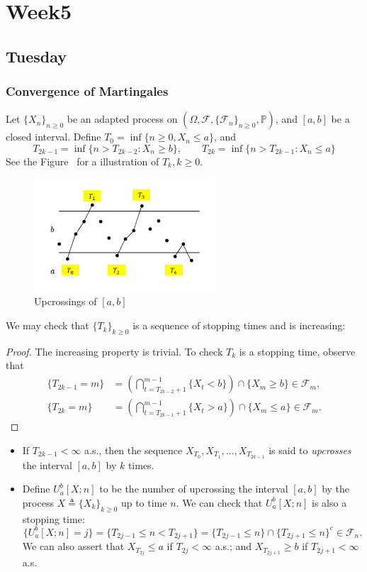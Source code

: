 
\chapter{Week5}

\section{Tuesday}

\subsection{Convergence of Martingales}

Let $\{X_n\}_{n\ge0}$ be an adapted process on $(\Omega,\mathcal{F},\{\mathcal{F}_n\}_{n\ge0},\mathbb{P})$, and $[a,b]$ be a closed interval.
Define $T_0=\inf\{n\ge0, X_n\le a\}$, and
\[
T_{2k-1} = \inf\{n>T_{2k-2}: X_n\ge b\},\qquad
T_{2k} = \inf\{n>T_{2k-1}: X_n\le a\}
\]
See the Figure~ for a illustration of $T_k, k\ge0$.
\begin{figure}[H]
\centering
\includegraphics[width=0.6\textwidth]{week5/p_1}
\caption{Upcrossings of $[a,b]$}
\end{figure}
We may check that $\{T_k\}_{k\ge0}$ is a sequence of stopping times and is increasing:
\begin{proof}
The increasing property is trivial. To check $T_k$ is a stopping time, observe that
\begin{align*}
\{T_{2k-1}=m\} &=\left(
\bigcap_{t=T_{2k-2}+1}^{m-1} \{X_{t}<b\}
\right)\cap\{X_m\ge b\}\in\mathcal{F}_m,\\
\{T_{2k}=m\} &=\left(
\bigcap_{t=T_{2k-1}+1}^{m-1} \{X_{t}>a\}
\right)\cap\{X_m\le a\}\in\mathcal{F}_m.
\end{align*}
\end{proof}

\begin{definition}[Upcrossing]
\begin{itemize}
\item
If $T_{2k-1}<\infty$ a.s., then the sequence $X_{T_0},X_{T_1},\ldots,X_{T_{2k-1}}$ is said to \emph{upcrosses} the interval $[a,b]$ by $k$ times.
\item
Define $U_a^b[X;n]$ to be the number of upcrossing the interval $[a,b]$ by the process 
$X\triangleq \{X_k\}_{k\ge0}$ up to time $n$.
We can check that $U_a^b[X;n]$ is also a stopping time:
\[
\{U_a^b[X;n] = j\} = \{T_{2j-1}\le n<T_{2j+1}\} = \{T_{2j-1}\le n\}\cap\{T_{2j+1}\le n\}^c\in\mathcal{F}_n.
\]
We can also assert that $X_{T_{2j}}\le a$ if $T_{2j}<\infty$ a.s.; and 
$X_{T_{2j+1}}\ge b$ if $T_{2j+1}<\infty$ a.s.
\end{itemize}
\end{definition}

